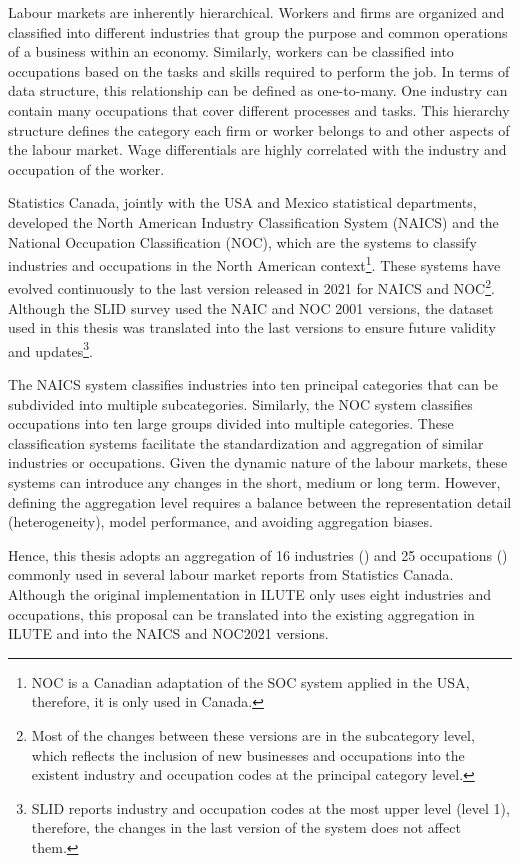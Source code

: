 Labour markets are inherently hierarchical. Workers and firms are organized and classified into different industries that group the purpose and common operations of a business within an economy. Similarly, workers can be classified into occupations based on the tasks and skills required to perform the job. In terms of data structure, this relationship can be defined as one-to-many. One industry can contain many occupations that cover different processes and tasks. This hierarchy structure defines the category each firm or worker belongs to and other aspects of the labour market. Wage differentials are highly correlated with the industry and occupation of the worker. 

Statistics Canada, jointly with the USA and Mexico statistical departments, developed the North American Industry Classification System (NAICS) and the National Occupation Classification (NOC), which are the systems to classify industries and occupations in the North American context\footnote{NOC is a Canadian adaptation of the SOC system applied in the USA, therefore, it is only used in Canada.}. These systems have evolved continuously to the last version released in 2021 for NAICS and NOC\footnote{Most of the changes between these versions are in the subcategory level, which reflects the inclusion of new businesses and occupations into the existent industry and occupation codes at the principal category level.}. Although the SLID survey used the NAIC and NOC 2001 versions, the dataset used in this thesis was translated into the last versions to ensure future validity and updates\footnote{SLID reports industry and occupation codes at the most upper level (level 1), therefore, the changes in the last version of the system does not affect them.}. 

The NAICS system classifies industries into ten principal categories that can be subdivided into multiple subcategories. Similarly, the NOC system classifies occupations into ten large groups divided into multiple categories. These classification systems facilitate the standardization and aggregation of similar industries or occupations. Given the dynamic nature of the labour markets, these systems can introduce any changes in the short, medium or long term. However, defining the aggregation level requires a balance between the representation detail (heterogeneity), model performance, and avoiding aggregation biases. 

Hence, this thesis adopts an aggregation of 16 industries () and 25 occupations () commonly used in several labour market reports from Statistics Canada. Although the original implementation in ILUTE only uses eight industries and occupations, this proposal can be translated into the existing aggregation in ILUTE and into the NAICS and NOC2021 versions.

